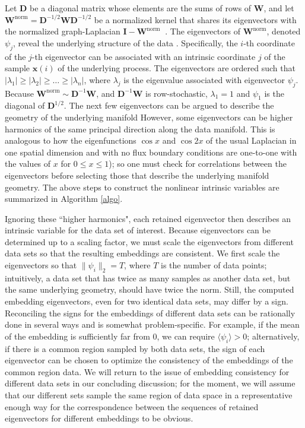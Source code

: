 \documentclass[aip,jcp,preprint]{revtex4-1}
\begin{document}
Let $\mathbf{D}$ be a diagonal matrix whose elements are the sums of rows of $\mathbf{W}$, and let $\mathbf{W}^{\mathrm{norm}} = \mathbf{D}^{-1/2}\mathbf{W}\mathbf{D}^{-1/2}$
be a normalized kernel that shares its eigenvectors with the normalized graph-Laplacian $\mathbf{I}-\mathbf{W}^{\mathrm{norm}} \:$ \cite{chung1997spectral}.
%
The eigenvectors of $\mathbf{W}^{\mathrm{norm}}$, denoted $\psi_j$, reveal the underlying structure of the data \cite{coifman2005geometric}.
%
Specifically, the $i$-th coordinate of the $j$-th eigenvector can be associated with an intrinsic coordinate $j$ of the sample $\mathbf{x}(i)$ of the underlying process.
%
The eigenvectors are ordered such that $|\lambda_1| \ge |\lambda_2| \ge \dots \ge |\lambda_n|$, where $\lambda_j$ is the eigenvalue associated with eigenvector $\psi_j$.
%
Because $\mathbf{W}^{\mathrm{norm}} \sim \mathbf{D}^{-1}\mathbf{W} $, and $\mathbf{D}^{-1}\mathbf{W}$ is row-stochastic,
$\lambda_1 = 1$ and $\psi_1$ is the diagonal of $\mathbf{D}^{1/2}$.
%
The next few eigenvectors can be argued to describe the geometry of the underlying manifold \cite{coifman2005geometric}
%
However, some eigenvectors can be higher harmonics of the same principal direction along the data manifold.
This is analogous to how the eigenfunctions $\cos x$ and $\cos 2x$ of the usual Laplacian in one spatial dimension
and with no flux boundary conditions are one-to-one with the values of $x$ for $0 \le x \le 1$);
so one must check for correlations between the eigenvectors before selecting those that describe the underlying manifold geometry.
%
The above steps to construct the nonlinear intrinsic variables are summarized in Algorithm \ref{algo}.

Ignoring these ``higher harmonics", each retained eigenvector then describes an intrinsic variable for the data set of interest.
%
Because eigenvectors can be determined up to a scaling factor,
we must scale the eigenvectors from different data sets so that the resulting embeddings are consistent.
%
We first scale the eigenvectors so that $\|\psi_i\|_2 = T$, where $T$ is the number of data points;
intuitively, a data set that has twice as many samples as another data set, but the same underlying geometry, should have twice the norm.
%
Still, the computed embedding eigenvectors, even for two identical data sets, may differ by a sign.
%
Reconciling the signs for the embeddings of different data sets can be rationally done in several ways and is somewhat problem-specific.
%
For example, if the mean of the embedding is sufficiently far from 0, we can require $\langle \psi_i \rangle > 0$;
alternatively, if there is a common region sampled by both data sets, the sign of each eigenvector can be chosen to optimize the consistency of the embeddings of the common region data.
%
We will return to the issue of embedding consistency for different data sets in our concluding discussion; for the moment,
we will assume that our different sets sample the same region of data space in a representative enough way for the
correspondence between the sequences of retained eigenvectors for different embeddings to be obvious.
\end{document}
